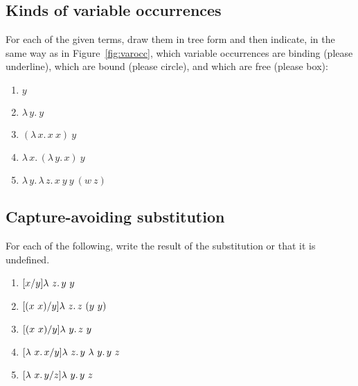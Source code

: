 \subsection{Kinds of variable occurrences}

 For each of the given terms, draw them in tree form and then
 indicate, in the same way as in Figure~\ref{fig:varocc}, which
 variable occurrences are binding (please underline), which are bound
 (please circle), and which are free (please box):
\begin{enumerate}

\item $y$

\vspace{.5cm}
\item $\lambda\, y.\ y$

\vspace{.5cm}
\item $(\lambda\, x.\, x\ x)\ y$

\vspace{.5cm}
\item $\lambda\, x.\, (\lambda\, y.\, x)\ y$

\vspace{.5cm}
\item $\lambda\, y.\, \lambda\, z.\, x\ y\ y\ (w\ z)$

\vspace{.5cm}
\end{enumerate}

\subsection{Capture-avoiding substitution}

For each of the following, write the result of the substitution or that it is undefined.

\begin{enumerate}
\item $[x/y]\lambda\ z.\, y\ y$
  
  \vspace{.5cm}

\item $[(x\ x)/y]\lam{z}{z\ (y\ y)}$

  \vspace{.5cm}

\item $[(x\ x)/y]\lam{y}{z\ y}$

  \vspace{.5cm}

\item $[\lam{x}{x}/y]\lam{z}{y\ \lam{y}{y\ z}}$

  \vspace{.5cm}

\item $[\lam{x}{y}/z]\lam{y}{y\ z}$
  \end{enumerate}


